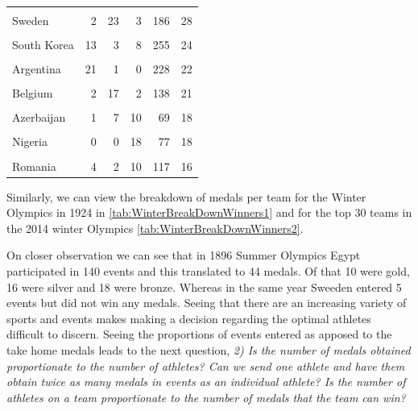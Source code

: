 \documentclass[
]{article}
\begin{document}
\begin{table}[H]
\begin{tabular}[t]{lrrrrr}
\cellcolor{gray!10}{Jamaica} & \cellcolor{gray!10}{11} & \cellcolor{gray!10}{17} & \cellcolor{gray!10}{2} & \cellcolor{gray!10}{77} & \cellcolor{gray!10}{30}\\
Sweden & 2 & 23 & 3 & 186 & 28\\
\cellcolor{gray!10}{Croatia} & \cellcolor{gray!10}{7} & \cellcolor{gray!10}{15} & \cellcolor{gray!10}{2} & \cellcolor{gray!10}{93} & \cellcolor{gray!10}{24}\\
South Korea & 13 & 3 & 8 & 255 & 24\\
\addlinespace
\cellcolor{gray!10}{South Africa} & \cellcolor{gray!10}{2} & \cellcolor{gray!10}{7} & \cellcolor{gray!10}{14} & \cellcolor{gray!10}{155} & \cellcolor{gray!10}{23}\\
Argentina & 21 & 1 & 0 & 228 & 22\\
\cellcolor{gray!10}{Hungary} & \cellcolor{gray!10}{12} & \cellcolor{gray!10}{3} & \cellcolor{gray!10}{7} & \cellcolor{gray!10}{204} & \cellcolor{gray!10}{22}\\
Belgium & 2 & 17 & 2 & 138 & 21\\
\cellcolor{gray!10}{Norway} & \cellcolor{gray!10}{0} & \cellcolor{gray!10}{0} & \cellcolor{gray!10}{19} & \cellcolor{gray!10}{77} & \cellcolor{gray!10}{19}\\
\addlinespace
Azerbaijan & 1 & 7 & 10 & 69 & 18\\
\cellcolor{gray!10}{Kazakhstan} & \cellcolor{gray!10}{3} & \cellcolor{gray!10}{5} & \cellcolor{gray!10}{10} & \cellcolor{gray!10}{123} & \cellcolor{gray!10}{18}\\
Nigeria & 0 & 0 & 18 & 77 & 18\\
\cellcolor{gray!10}{Poland} & \cellcolor{gray!10}{3} & \cellcolor{gray!10}{3} & \cellcolor{gray!10}{10} & \cellcolor{gray!10}{285} & \cellcolor{gray!10}{16}\\
Romania & 4 & 2 & 10 & 117 & 16\\
\bottomrule
\end{tabular}
\end{table}

Similarly, we can view the breakdown of medals per team for the Winter Olympics in 1924 in \ref{tab:WinterBreakDownWinners1} and for the top 30 teams in the 2014 winter Olympics \ref{tab:WinterBreakDownWinners2}.

On closer observation we can see that in 1896 Summer Olympics Egypt participated in 140 events and this translated to 44 medals. Of that 10 were gold, 16 were silver and 18 were bronze. Whereas in the same year Sweeden entered 5 events but did not win any medals. Seeing that there are an increasing variety of sports and events makes making a decision regarding the optimal athletes difficult to discern. Seeing the proportions of events entered as apposed to the take home medals leads to the next question, \emph{2) Is the number of medals obtained proportionate to the number of athletes? Can we send one athlete and have them obtain twice as many medals in events as an individual athlete? Is the number of athletes on a team proportionate to the number of medals that the team can win?}
\end{document}
